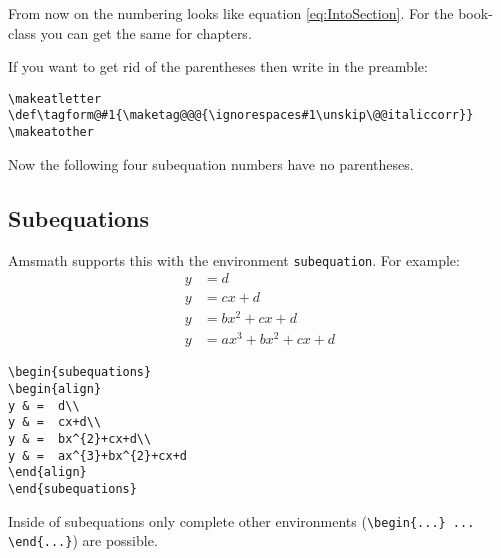 \begin{table}[htb]
\begin{leftbar}
From now on the numbering looks like    %
equation \vref{eq:IntoSection}. For the book-class you can get the
same for chapters.
\end{leftbar}

If you want to get rid of the parentheses then write in the preamble:    %

\begin{lstlisting}
\makeatletter
\def\tagform@#1{\maketag@@@{\ignorespaces#1\unskip\@@italiccorr}}
\makeatother
\end{lstlisting}

Now the following four subequation numbers have no parentheses.




\makeatletter
\let\oldTagForm\tagform@
\def\tagform@#1{\maketag@@@{\ignorespaces#1\unskip\@@italiccorr}}
\makeatother

\subsection{Subequations}\label{ams:subeqn}

Amsmath supports this with the environment \verb|subequation|.
For example:
\begin{subequations}
\begin{align}
y & =  d\\
y & =  cx+d\\
y & =  bx^{2}+cx+d\\
y & =  ax^{3}+bx^{2}+cx+d
\end{align}
\end{subequations}

\begin{lstlisting}
\begin{subequations}
\begin{align}
y & =  d\\
y & =  cx+d\\
y & =  bx^{2}+cx+d\\
y & =  ax^{3}+bx^{2}+cx+d
\end{align}
\end{subequations}
\end{lstlisting}

\makeatletter
\let\tagform@\oldTagForm
\makeatother


Inside of subequations only complete other environments (\texttt{\textbackslash{}begin\{...\}
... \textbackslash{}end\{...\}}) are possible.


\end{table}
